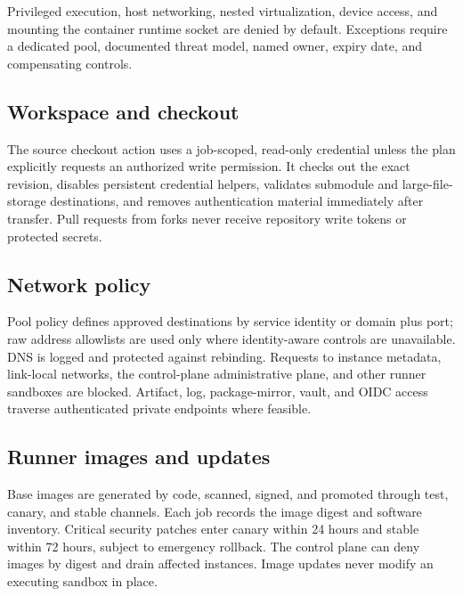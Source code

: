 Privileged execution, host networking, nested virtualization, device access, and
mounting the container runtime socket are denied by default. Exceptions require a
dedicated pool, documented threat model, named owner, expiry date, and compensating controls.

\subsection{Workspace and checkout}

The source checkout action uses a job-scoped, read-only credential unless the plan
explicitly requests an authorized write permission. It checks out the exact revision,
disables persistent credential helpers, validates submodule and large-file-storage
destinations, and removes authentication material immediately after transfer. Pull
requests from forks never receive repository write tokens or protected secrets.

\subsection{Network policy}

Pool policy defines approved destinations by service identity or domain plus port;
raw address allowlists are used only where identity-aware controls are unavailable.
DNS is logged and protected against rebinding. Requests to instance metadata,
link-local networks, the control-plane administrative plane, and other runner
sandboxes are blocked. Artifact, log, package-mirror, vault, and OIDC access traverse
authenticated private endpoints where feasible.

\subsection{Runner images and updates}

Base images are generated by code, scanned, signed, and promoted through test,
canary, and stable channels. Each job records the image digest and software inventory.
Critical security patches enter canary within 24 hours and stable within 72 hours,
subject to emergency rollback. The control plane can deny images by digest and drain
affected instances. Image updates never modify an executing sandbox in place.

